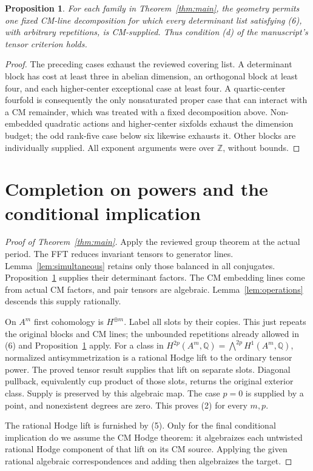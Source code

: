 \documentclass[11pt]{article}
\newcommand{\Q}{\mathbb Q}
\newcommand{\Z}{\mathbb Z}
\newtheorem{proposition}[theorem]{Proposition}
\theoremstyle{remark}
\begin{document}
\begin{proposition}\label{prop:balance}
For each family in Theorem~\ref{thm:main}, the geometry permits one
fixed CM-line decomposition for which every determinant list satisfying
(6), with arbitrary repetitions, is CM-supplied. Thus condition (d)
of the manuscript's tensor criterion holds.
\end{proposition}
\begin{proof}
The preceding cases exhaust the reviewed covering list. A determinant
block has cost at least three in abelian dimension, an orthogonal
block at least four, and each higher-center exceptional case at least
four. A quartic-center fourfold is consequently the only nonsaturated
proper case that can interact with a CM remainder, which was treated
with a fixed decomposition above. Non-embedded quadratic actions and
higher-center sixfolds exhaust the dimension budget; the odd rank-five
case below six likewise exhausts it. Other blocks are individually
supplied. All exponent arguments were over $\Z$, without bounds.
\end{proof}

\section{Completion on powers and the conditional implication}

\begin{proof}[Proof of Theorem~\ref{thm:main}]
Apply the reviewed group theorem at the actual period.
The FFT reduces invariant tensors to generator lines.
Lemma~\ref{lem:simultaneous} retains only those balanced in all conjugates.
Proposition~\ref{prop:balance} supplies their determinant factors.
The CM embedding lines come from actual CM factors, and pair tensors
are algebraic. Lemma~\ref{lem:operations} descends this supply rationally.

On $A^m$ first cohomology is $H^{\oplus m}$. Label all slots by their
copies. This just repeats the original blocks and CM lines; the
unbounded repetitions already allowed in (6) and
Proposition~\ref{prop:balance} apply. For a class in
$H^{2p}(A^m,\Q)=\bigwedge^{2p}H^1(A^m,\Q)$, normalized
antisymmetrization is a rational Hodge lift to the ordinary tensor power.
The proved tensor result supplies that lift on separate slots.
Diagonal pullback, equivalently cup product of those slots, returns
the original exterior class. Supply is preserved by this algebraic map.
The case $p=0$ is supplied by a point, and nonexistent degrees are zero.
This proves (2) for every $m,p$.

The rational Hodge lift is furnished by (5).
Only for the final conditional implication do we assume the CM Hodge
theorem: it algebraizes each untwisted rational Hodge component of that
lift on its CM source. Applying the given rational algebraic
correspondences and adding then algebraizes the target.
\end{proof}
\end{document}
